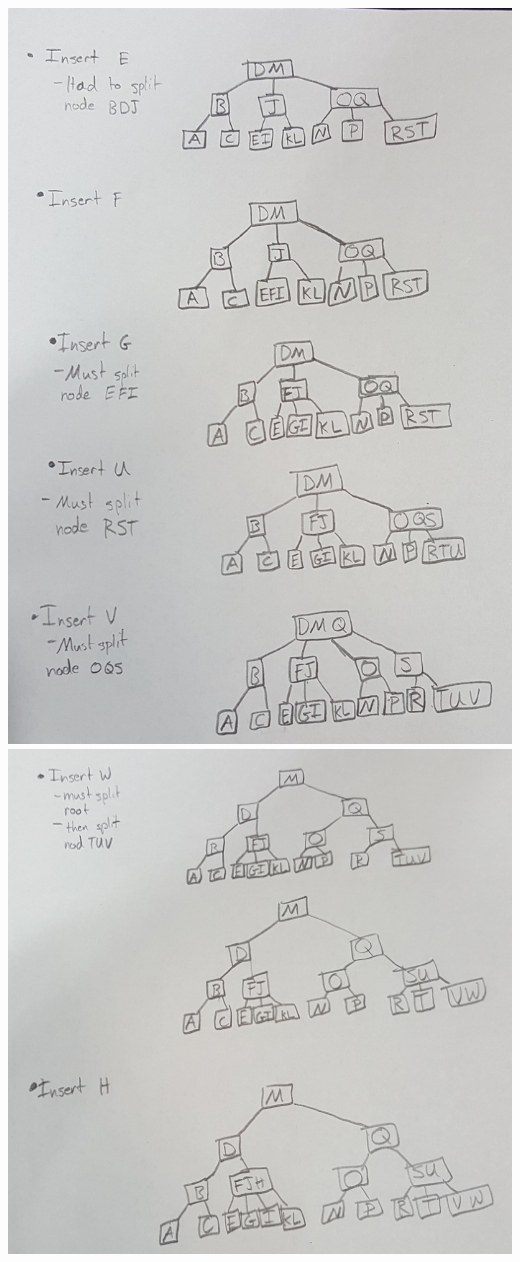 \documentclass[12pt]{elsart}
\begin{document}
\begin{enumerate}
	\includegraphics[scale=0.12]{part1.jpg}\\
	\includegraphics[scale=0.12]{part2.jpg}

\end{enumerate}
\end{document}
